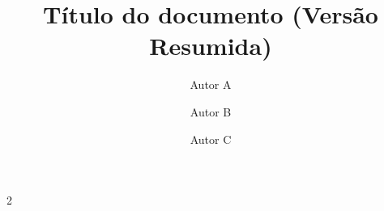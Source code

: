 \documentclass[a4paper,12pt]{article}
\title{Título do documento (Versão Resumida)}
\author[1]{Autor A}
\author[1]{Autor B}
\author[1]{Autor C}
\affil[1]{Pós-graduação em Inteligência Artificial Aplicada, UniSENAI}
\date{}
\begin{document}
\maketitle

\begin{multicols*}{2}











\end{multicols*}
\end{document}
